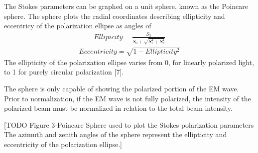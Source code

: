 %
The Stokes parameters can be graphed on a unit sphere, known as the Poincare sphere.  The sphere plots the radial coordinates describing ellipticity and eccentricy of the polarization ellipse as angles of
%
\begin{align}
    Ellipicity = \frac{S_3}{S_0+\sqrt{S_1^2+S_2^2 }}
\end{align}
\begin{align}
    Eccentricity= \sqrt{1-Ellipticity^2}
\end{align}
%
The ellipticity of the polarization ellipse varies from 0, for linearly polarized light, to 1 for purely circular polarization [7].

The sphere is only capable of showing the polarized portion of the EM wave.  Prior to normalization, if the EM wave is not fully polarized, the intensity of the polarized beam must be normalized in relation to the total beam intensity.

[TODO Figure 3-Poincare Sphere used to plot the Stokes polarization parameters
The azimuth and zenith angles of the sphere represent the ellipticity and eccentricity of the polarization ellipse.]
